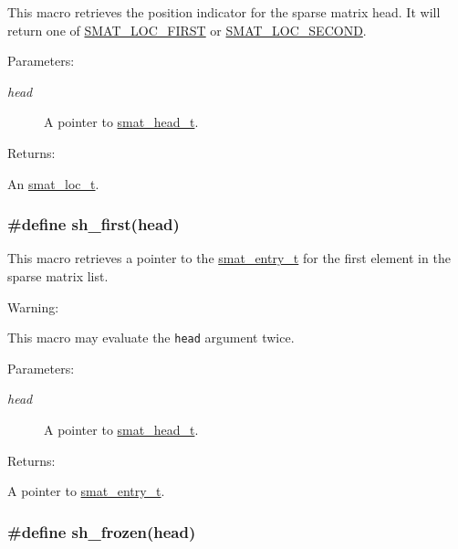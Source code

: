 This macro retrieves the position indicator for the sparse matrix head. It will return one of \hyperlink{group__dbprim__smat_a48a136}{SMAT\_\-LOC\_\-FIRST} or \hyperlink{group__dbprim__smat_a48a137}{SMAT\_\-LOC\_\-SECOND}.\begin{Desc}
\item[Parameters: ]\par
\begin{description}
\item[{\em 
head}]A pointer to \hyperlink{group__dbprim__smat_a1}{smat\_\-head\_\-t}.\end{description}
\end{Desc}
\begin{Desc}
\item[Returns: ]\par
An \hyperlink{group__dbprim__smat_a6}{smat\_\-loc\_\-t}. \end{Desc}
\hypertarget{group__dbprim__smat_a35}{
\subsubsection[sh\_\-first]{\setlength{\rightskip}{0pt plus 5cm}\#define sh\_\-first(head)}}
\label{group__dbprim__smat_a35}


This macro retrieves a pointer to the \hyperlink{group__dbprim__smat_a2}{smat\_\-entry\_\-t} for the first element in the sparse matrix list.

\begin{Desc}
\item[Warning: ]\par
This macro may evaluate the {\tt head} argument twice.\end{Desc}
\begin{Desc}
\item[Parameters: ]\par
\begin{description}
\item[{\em 
head}]A pointer to \hyperlink{group__dbprim__smat_a1}{smat\_\-head\_\-t}.\end{description}
\end{Desc}
\begin{Desc}
\item[Returns: ]\par
A pointer to \hyperlink{group__dbprim__smat_a2}{smat\_\-entry\_\-t}. \end{Desc}
\hypertarget{group__dbprim__smat_a33}{
\subsubsection[sh\_\-frozen]{\setlength{\rightskip}{0pt plus 5cm}\#define sh\_\-frozen(head)}}
\label{group__dbprim__smat_a33}


